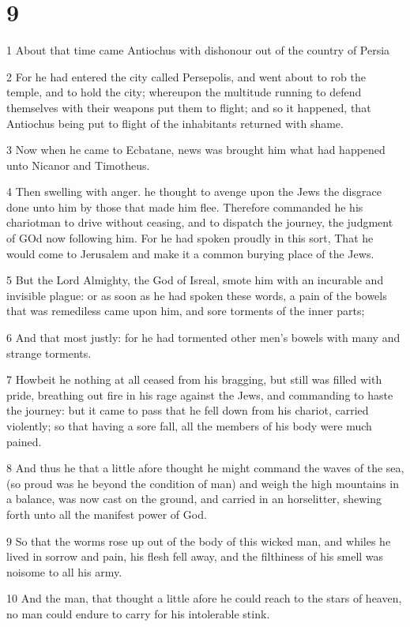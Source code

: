 \chapter{9}

\par 1 About that time came Antiochus with dishonour out of the country of Persia
\par 2 For he had entered the city called Persepolis, and went about to rob the temple, and to hold the city; whereupon the multitude running to defend themselves with their weapons put them to flight; and so it happened, that Antiochus being put to flight of the inhabitants returned with shame.
\par 3 Now when he came to Ecbatane, news was brought him what had happened unto Nicanor and Timotheus.
\par 4 Then swelling with anger. he thought to avenge upon the Jews the disgrace done unto him by those that made him flee. Therefore commanded he his chariotman to drive without ceasing, and to dispatch the journey, the judgment of GOd now following him. For he had spoken proudly in this sort, That he would come to Jerusalem and make it a common burying place of the Jews.
\par 5 But the Lord Almighty, the God of Isreal, smote him with an incurable and invisible plague: or as soon as he had spoken these words, a pain of the bowels that was remediless came upon him, and sore torments of the inner parts;
\par 6 And that most justly: for he had tormented other men's bowels with many and strange torments.
\par 7 Howbeit he nothing at all ceased from his bragging, but still was filled with pride, breathing out fire in his rage against the Jews, and commanding to haste the journey: but it came to pass that he fell down from his chariot, carried violently; so that having a sore fall, all the members of his body were much pained.
\par 8 And thus he that a little afore thought he might command the waves of the sea, (so proud was he beyond the condition of man) and weigh the high mountains in a balance, was now cast on the ground, and carried in an horselitter, shewing forth unto all the manifest power of God.
\par 9 So that the worms rose up out of the body of this wicked man, and whiles he lived in sorrow and pain, his flesh fell away, and the filthiness of his smell was noisome to all his army.
\par 10 And the man, that thought a little afore he could reach to the stars of heaven, no man could endure to carry for his intolerable stink.
